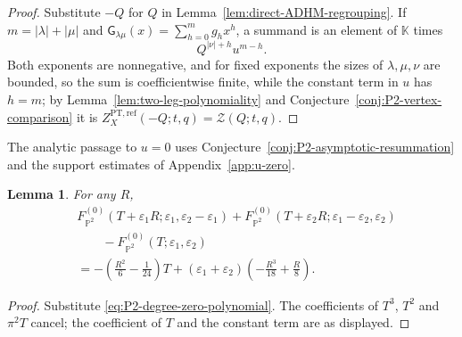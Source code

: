 \documentclass{amsart}
\newtheorem{lemma}{Lemma}
\theoremstyle{definition}
\numberwithin{equation}{section}
\newcommand{\K}{\mathbb K}
\newcommand{\eps}{\varepsilon}
\newcommand{\PT}{\mathrm{PT}}
\begin{document}
\begin{proof}
Substitute \(-Q\) for \(Q\) in Lemma~\ref{lem:direct-ADHM-regrouping}.  If \(m=|\lambda|+|\mu|\) and \(\mathsf G_{\lambda\mu}(x)=\sum_{h=0}^m g_hx^h\), a summand is an element of \(\K\) times
\[
 Q^{|\nu|+h}u^{m-h}.
\]
Both exponents are nonnegative, and for fixed exponents the sizes of \(\lambda,\mu,\nu\) are bounded, so the sum is coefficientwise finite, while the constant term in \(u\) has \(h=m\); by Lemma~\ref{lem:two-leg-polynomiality} and Conjecture~\ref{conj:P2-vertex-comparison} it is \(Z_{X}^{\PT,\mathrm{ref}}(-Q;t,q)=\mathcal Z(Q;t,q)\).
\end{proof}

The analytic passage to \(u=0\) uses Conjecture~\ref{conj:P2-asymptotic-resummation} and the support estimates of Appendix~\ref{app:u-zero}.

\begin{lemma}
\label{lem:P2-perturbative-shift}
For any \(R\),
\begin{equation}
\begin{aligned}
 &F_{\mathbb P^2}^{(0)}
 (T+\eps_1R;\eps_1,\eps_2-\eps_1)
 +F_{\mathbb P^2}^{(0)}
 (T+\eps_2R;\eps_1-\eps_2,\eps_2)\\
 &\qquad-F_{\mathbb P^2}^{(0)}
 (T;\eps_1,\eps_2)\\
 &=-\left(\frac{R^2}{6}-\frac1{24}\right)T
 +(\eps_1+\eps_2)\left(-\frac{R^3}{18}+\frac R8\right).
\end{aligned}
\label{eq:P2-perturbative-shift}
\end{equation}
\end{lemma}

\begin{proof}
Substitute \eqref{eq:P2-degree-zero-polynomial}.  The coefficients of \(T^3\), \(T^2\) and \(\pi^2T\) cancel; the coefficient of \(T\) and the constant term are as displayed.
\end{proof}
\end{document}
